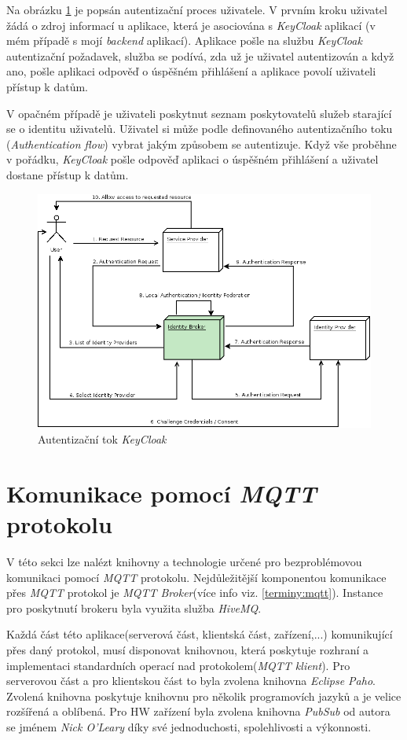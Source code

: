 Na obrázku \ref{figure:keycloak_flow} je popsán autentizační proces uživatele. V prvním kroku uživatel žádá o zdroj informací u aplikace, která je asociována s \emph{KeyCloak} aplikací (v mém případě s mojí \emph{backend} aplikací).
Aplikace pošle na službu \emph{KeyCloak} autentizační požadavek, služba se podívá, zda už je uživatel autentizován a když ano, pošle aplikaci odpověď o úspěšném přihlášení a aplikace povolí uživateli přístup k datům.

V opačném případě je uživateli poskytnut seznam poskytovatelů služeb starající se o identitu uživatelů.
Uživatel si může podle definovaného autentizačního toku (\emph{Authentication flow}) vybrat jakým způsobem se autentizuje. Když vše proběhne v pořádku, \emph{KeyCloak} pošle odpověď aplikaci o úspěšném přihlášení a uživatel dostane přístup k datům.

\begin{figure}[hbt]
  \centering
  \includegraphics[width=.8 \linewidth]{obrazky-figures/keycloak_flow.png}
  \caption{Autentizační tok \emph{KeyCloak}}
  \label{figure:keycloak_flow}
\end{figure}

\section{Komunikace pomocí \emph{MQTT} protokolu}
\label{pouzite:mqtt}

V této sekci lze nalézt knihovny a technologie určené pro bezproblémovou komunikaci pomocí \emph{MQTT} protokolu.
Nejdůležitější komponentou komunikace přes \emph{MQTT} protokol je \emph{MQTT Broker}(více info viz. \ref{terminy:mqtt}).
Instance pro poskytnutí brokeru byla využita služba \emph{HiveMQ}.

Každá část této aplikace(serverová část, klientská část, zařízení,...) komunikující přes daný protokol, musí disponovat knihovnou, která poskytuje rozhraní a implementaci standardních operací nad protokolem(\emph{MQTT klient}).
Pro serverovou část a pro klientskou část to byla zvolena knihovna \emph{Eclipse Paho}. Zvolená knihovna poskytuje knihovnu pro několik programovích jazyků a je velice rozšířená a oblíbená.
Pro HW zařízení byla zvolena knihovna \emph{PubSub} od autora se jménem \emph{Nick O'Leary} díky své jednoduchosti, spolehlivosti a výkonnosti.

